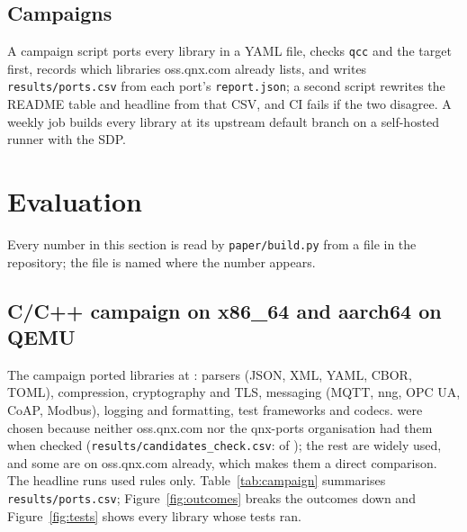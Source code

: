 \documentclass[conference]{IEEEtran}
\begin{document}
\subsection{Campaigns}\label{sec:campaigns}
A campaign script ports every library in a YAML file, checks \texttt{qcc} and the target first, records which
libraries oss.qnx.com already lists, and writes \texttt{results/ports.csv} from each port's
\texttt{report.json}; a second script rewrites the README table and headline from that CSV, and CI fails if the
two disagree. A weekly job builds every library at its upstream default branch on a self-hosted runner with the
SDP.

\section{Evaluation}\label{sec:eval}

Every number in this section is read by \texttt{paper/build.py} from a file in the repository; the file is named
where the number appears.

\subsection{C/C++ campaign on x86\_64 and aarch64 on QEMU}\label{sec:eval-campaign}
The campaign ported  libraries at : parsers (JSON, XML, YAML, CBOR, TOML),
compression, cryptography and TLS, messaging (MQTT, nng, OPC UA, CoAP, Modbus), logging and formatting, test
frameworks and codecs.  were chosen because neither oss.qnx.com nor the qnx-ports organisation had them when
checked (\texttt{results/candidates\_check.csv}:  of ); the rest are widely used, and
some are on oss.qnx.com already, which makes them a direct comparison. The headline runs used rules only.
Table~\ref{tab:campaign} summarises \texttt{results/ports.csv}; Figure~\ref{fig:outcomes} breaks the outcomes
down and Figure~\ref{fig:tests} shows every library whose tests ran.
\end{document}

